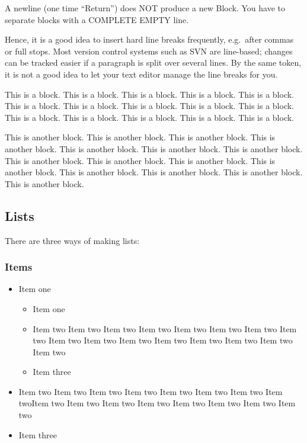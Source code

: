 A newline (one time ``Return'') does NOT produce a new Block.
You have to separate blocks with a COMPLETE EMPTY line.

Hence, it is a good idea to insert hard line breaks frequently,
e.g.~after commas or full stops.
Most version control systems such as SVN are line-based;
changes can be tracked easier if a paragraph is split
over several lines.
By the same token, it is not a good idea to let your text editor
manage the line breaks for you.

This is a block. This is a block. This is a block. This is a block.
This is a block. This is a block. This is a block. This is a block.
This is a block. This is a block. This is a block. This is a block.
This is a block. This is a block. This is a block.

This is another block. This is another block. This is another block.
This is another block. This is another block. This is another block.
This is another block. This is another block. This is another block.
This is another block. This is another block. This is another block.
This is another block. This is another block. This is another block.

\subsection{Lists}

There are three ways of making lists:

\subsubsection{Items}

\begin{itemize}
  \item Item one
  \begin{itemize}
    \item Item one
    \item Item two Item two Item two Item two Item two Item two Item
    two Item two
    Item two Item two Item two Item two Item two Item two Item
    two Item two
    \item Item three
  \end{itemize}
  \item Item two Item two Item two Item two Item two Item two Item two
Item twoItem two Item two Item two Item two Item two Item two Item two
Item two
  \item Item three
\end{itemize}

